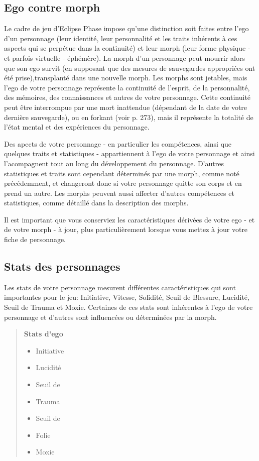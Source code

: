 \subsection{Ego contre morph} \label{sec:ego-vs.-morph-1} 

Le cadre de jeu d'Eclipse Phase impose qu'une distinction soit faites entre l'ego d'un personnage (leur identité, leur personnalité et les traits inhérents à ces aspects qui se perpétue dans la continuité) et leur morph (leur forme physique - et parfois virtuelle - éphémère). La morph d'un personnage peut mourrir alors que son ego survit (en supposant que des mesures de sauvegardes appropriées ont été prise),transplanté dans une nouvelle morph. Les morphs sont jetables, mais l'ego de votre personnage représente la continuité de l'esprit, de la personnalité, des mémoires, des connaissances et autres de votre personnage. Cette continuité peut être interrompue par une mort inattendue (dépendant de la date de votre dernière sauvegarde), ou en forkant (voir p. 273), mais il représente la totalité de l'état mental et des expériences du personnage. 

Des apects de votre personnage - en particulier les compétences, ainsi que quelques traits et statistiques - appartiennent à l'ego de votre personnage et ainsi l'acompagnent tout au long du développement du personnage. D'autres statistiques et traits sont cependant déterminés par une morph, comme noté précédemment, et changeront donc si votre personnage quitte son corps et en prend un autre. Les morphs peuvent aussi affecter d'autres compétences et statistiques, comme détaillé dans la description des morphs. 

Il est important que vous conserviez les caractéristiques dérivées de votre ego - et de votre morph - à jour, plus particulièrement lorsque vous mettez à jour votre fiche de personnage. 

\subsection{Stats des personnages} \label{sec:character-stats} 

Les stats de votre personnage mesurent différentes caractéristiques qui sont importantes pour le jeu: Initiative, Vitesse, Solidité, Seuil de Blessure, Lucidité, Seuil de Trauma et Moxie. Certaines de ces stats sont inhérentes à l'ego de votre personnage et d'autres sont influencées ou déterminées par la morph. 

\begin{quotation} \textbf{Stats d'ego} \begin{itemize} \item Initiative \item Lucidité \item Seuil de \item Trauma\item Seuil de \item Folie \item Moxie \end{itemize} \end{quotation} 


